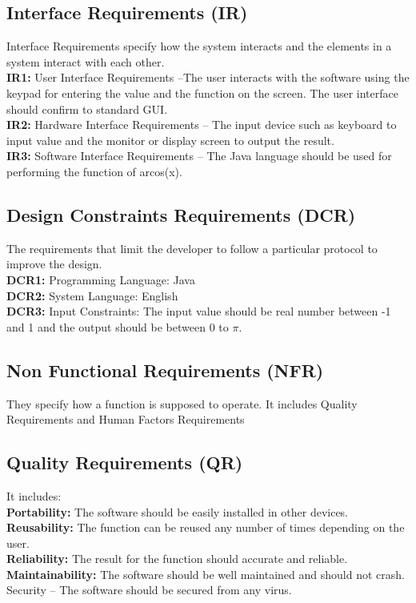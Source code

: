 \documentclass[12pt]{report}
\begin{document}
\subsection*{Interface Requirements (IR)}Interface Requirements specify how the system interacts and the elements in a system interact with each other.\\
\textbf{IR1: }User Interface Requirements –The user interacts with the software using the keypad for entering the value and the function on the screen. The user interface should confirm to standard GUI.\\
\textbf{IR2: }Hardware Interface Requirements – The input device such as keyboard to input value and the monitor or display screen to output the result.\\
\textbf{IR3: }Software Interface Requirements – The Java language should be used for performing the function of arcos(x).
\subsection*{Design Constraints Requirements (DCR)}The requirements that limit the developer to follow a particular protocol to improve the design.\\
	\textbf{DCR1: }Programming Language: Java\\
	\textbf{DCR2: }System Language: English\\
\textbf{DCR3: }Input Constraints: The input value should be real number between -1 and 1 and the output should be between 0 to $\pi$. 	

\subsection*{Non Functional Requirements (NFR)}They specify how a function is supposed to operate. It includes Quality Requirements and Human Factors Requirements
\subsection*{Quality Requirements (QR)}It includes:\\
	\textbf{Portability: }The software should be easily installed in other devices.\\
	\textbf{Reusability: }The function can be reused any number of times depending on the user.\\
\textbf{Reliability: }The result for the function should accurate and reliable.\\
\textbf{Maintainability: }The software should be well maintained and should not crash.\\
Security – The software should be secured from any virus.
\end{document}
